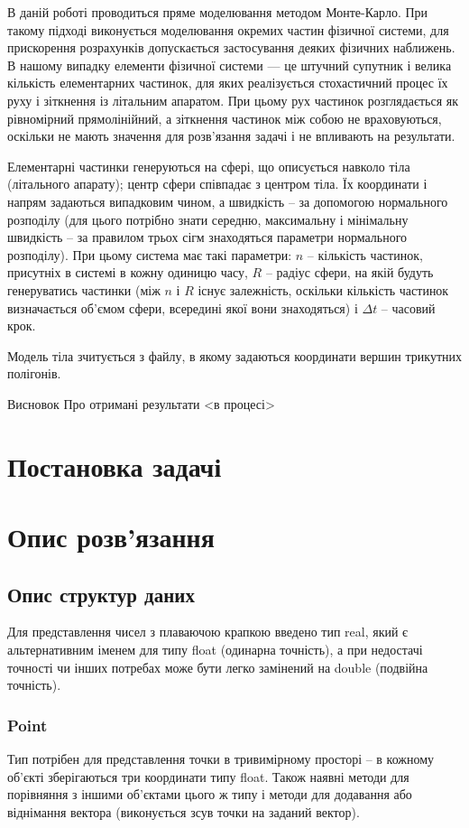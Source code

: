 \documentclass[a4paper,12pt]{article}
\begin{document}
В даній роботі проводиться пряме моделювання методом Монте-Карло. При такому підході виконується моделювання окремих частин фізичної системи, для прискорення розрахунків допускається застосування деяких фізичних наближень. В нашому випадку елементи фізичної системи — це штучний супутник і велика кількість елементарних частинок, для яких реалізується стохастичний процес їх руху і зіткнення із літальним апаратом. При цьому рух частинок розглядається як рівномірний прямолінійний, а зіткнення частинок між собою не враховуються, оскільки не мають значення для розв’язання задачі і не впливають на результати.

Елементарні частинки генеруються на сфері, що описується навколо тіла (літального апарату); центр сфери співпадає з центром тіла. Їх координати і напрям задаються випадковим чином, а швидкість -- за допомогою нормального розподілу (для цього потрібно знати середню, максимальну і мінімальну швидкість -- за правилом трьох сігм знаходяться параметри нормального розподілу). При цьому система має такі параметри: $n$ -- кількість частинок, присутніх в системі в кожну одиницю часу, $R$ -- радіус сфери, на якій будуть генеруватись частинки (між $n$ і $R$ існує залежність, оскільки кількість частинок визначається об’ємом сфери, всередині якої вони знаходяться) і $\Delta t$ -- часовий крок.

Модель тіла зчитується з файлу, в якому задаються координати вершин трикутних полігонів. 

Висновок
Про отримані результати <в процесі>

\section{Постановка задачі}

\section{Опис розв’язання}
\subsection{Опис структур даних}
Для представлення чисел з плаваючою крапкою введено тип real, який є альтернативним іменем для типу float (одинарна точність), а при недостачі точності чи інших потребах може бути легко замінений на double (подвійна точність).

\subsubsection{Point}
Тип потрібен для представлення точки в тривимірному просторі -- в кожному об’єкті зберігаються три координати типу float. Також наявні методи для порівняння з іншими об’єктами цього ж типу і методи для додавання або віднімання вектора (виконується зсув точки на заданий вектор).
\end{document}
